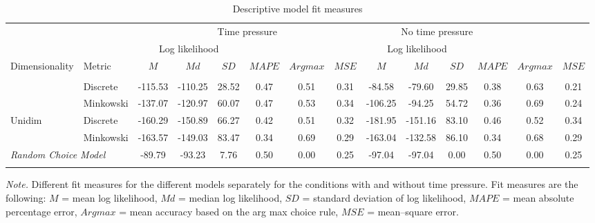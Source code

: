\documentclass[a4paper,man,natbib]{apa6}
\begin{document}
\begin{table}
\begin{center}
\begin{threeparttable}
\caption{Descriptive model fit measures}
\label{tab:fitmeasures}
\begin{tabular}{llcccccccccccc}
\toprule
 &  & \multicolumn{6}{c}{Time pressure} & \multicolumn{4}{c}{No time pressure}\\
\cmidrule(r){3-8} \cmidrule(r){9-14}
 &  & \multicolumn{3}{c}{Log likelihood} & & & & \multicolumn{3}{c}{Log likelihood} & & & \\
\cmidrule(r){3-5} \cmidrule(r){9-11}
Dimensionality & \multicolumn{1}{l}{Metric} & \multicolumn{1}{c}{$M$} & \multicolumn{1}{c}{$Md$} & \multicolumn{1}{c}{$SD$} & \multicolumn{1}{c}{$MAPE$} & \multicolumn{1}{c}{$Arg max$} & \multicolumn{1}{c}{$MSE$} & \multicolumn{1}{c}{$M$} & \multicolumn{1}{c}{$Md$} & \multicolumn{1}{c}{$SD$} & \multicolumn{1}{c}{$MAPE$} & \multicolumn{1}{c}{$Arg max$} & \multicolumn{1}{c}{$MSE$}\\
\midrule
\addlinespace
\multicolumn{2}{l}{\emph{Generalized Context Model}} \\
\addlinespace
\multirow{2}{*}{Multidim} & Discrete & -115.53 & -110.25 & 28.52 & 0.47 & 0.51 & 0.31 & -84.58 & -79.60 & 29.85 & 0.38 & 0.63 & 0.21\\
\cmidrule(r){2-14}
 & Minkowski & -137.07 & -120.97 & 60.07 & 0.47 & 0.53 & 0.34 & -106.25 & -94.25 & 54.72 & 0.36 & 0.69 & 0.24\\
\cmidrule(r){1-14}
\multirow{2}{*}{Unidim} & Discrete & -160.29 & -150.89 & 66.27 & 0.42 & 0.51 & 0.32 & -181.95 & -151.16 & 83.10 & 0.46 & 0.52 & 0.34\\
\cmidrule(r){2-14}
 & Minkowski & -163.57 & -149.03 & 83.47 & 0.34 & 0.69 & 0.29 & -163.04 & -132.58 & 86.10 & 0.34 & 0.68 & 0.29\\
\cmidrule(r){1-14}
\multicolumn{2}{l}{\emph{Random Choice Model}} & -89.79 & -93.23 & 7.76 & 0.50 & 0.00 & 0.25 & -97.04 & -97.04 & 0.00 & 0.50 & 0.00 & 0.25\\
\bottomrule
\addlinespace
\end{tabular}
\begin{tablenotes}[para]
\textit{Note.} Different fit measures for the different models separately for the conditions with and without time pressure. 
          Fit measures are the following: $M$ = mean log likelihood, $Md$ = median log likelihood, $SD$ = standard deviation of log likelihood, $MAPE$ = mean absolute percentage error, $Arg max$ = mean accuracy based on the arg max choice rule, $MSE$ = mean--square error.
\end{tablenotes}
\end{threeparttable}
\end{center}
\end{table}
\end{document}
